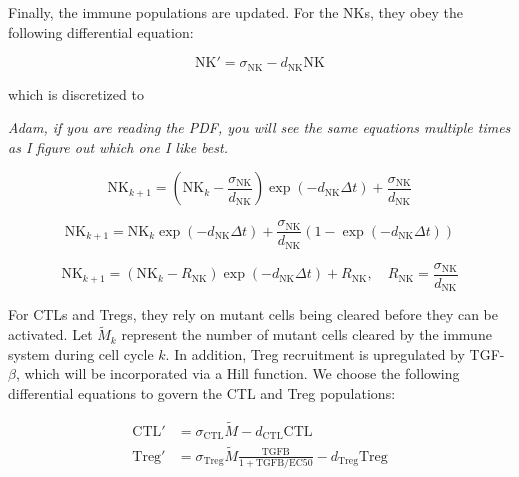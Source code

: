 \documentclass{article}
\begin{document}
Finally, the immune populations are updated.
For the NKs, they obey the following differential equation:
 
$$ \text{NK}' = \sigma_{\text{NK}} - d_{\text{NK}}\text{NK} $$

which is discretized to

\emph{Adam, if you are reading the PDF, you will see the same equations multiple times as I figure out which one I like best.}

$$ \text{NK}_{k+1} = \left (\text{NK}_k-\frac{\sigma_{\text{NK}}}{d_{\text{NK}}} \right )\exp(-d_{\text{NK}}\Delta t)+\frac{\sigma_{\text{NK}}}{d_{\text{NK}}} $$

$$ \text{NK}_{k+1} = \text{NK}_k\exp(-d_{\text{NK}}\Delta t)+\frac{\sigma_{\text{NK}}}{d_{\text{NK}}} \left(1-\exp(-d_{\text{NK}}\Delta t)\right)$$

$$\text{NK}_{k+1} = (\text{NK}_k-R_\text{NK})\exp(-d_\text{NK}\Delta t)+R_\text{NK},\quad R_\text{NK}=\frac{\sigma_\text{NK}}{d_\text{NK}}$$





For CTLs and Tregs, they rely on mutant cells being cleared before they can be activated.
Let $\tilde{M}_k$ represent the number of mutant cells cleared by the immune system during cell cycle $k$.
In addition, Treg recruitment is upregulated by TGF-$\beta$, which will be incorporated via a Hill function.
We choose the following differential equations to govern the CTL and Treg populations:

\begin{align*}
\text{CTL}' & = \sigma_{\text{CTL}}\tilde{M} - d_{\text{CTL}}\text{CTL} \\
\text{Treg}' & = \sigma_{\text{Treg}}\tilde{M} \frac{\text{TGFB}}{1+\text{TGFB}/\text{EC50}}- d_{\text{Treg}}\text{Treg}
\end{align*}
\end{document}
